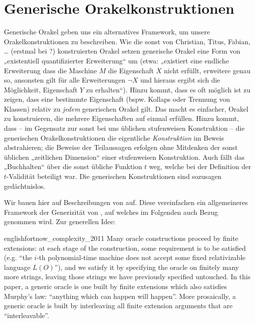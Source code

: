 \documentclass[nofonts]{uebung}
\theoremstyle{definition}
\begin{document}
\clearpage
\section{Generische Orakelkonstruktionen}

Generische Orakel geben uns ein alternatives Framework, um unsere Orakelkonstruktionen zu beschreiben. Wie die sonst von Christian, Titus, Fabian, \dots{} (erstmal bei \cite{dose_np-completeness_2019}?) konstruierten Orakel setzen generische Orakel eine Form von „existentiell quantifizierter Erweiterung“ um (etwa: „existiert eine endliche Erweiterung dass die Maschine $M$ die Eigenschaft $X$ nicht erfüllt, erweitere genau so, ansonsten gilt für alle Erweiterungen $\neg X$ und hieraus ergibt sich die Möglichkeit, Eigenschaft $Y$ zu erhalten“).
Hinzu kommt, dass es oft möglich ist zu zeigen, dass eine bestimmte Eigenschaft (bspw. Kollaps oder Trennung von Klassen) relativ zu \emph{jedem} generischen Orakel gilt. Das macht es einfacher, Orakel zu konstruieren, die mehrere Eigenschaften auf einmal erfüllen.
Hinzu kommt, dass -- im Gegensatz zur sonst bei uns üblichen stufenweisen Konstruktion  -- die generischen Orakelkonstruktionen die eigentliche \emph{Konstruktion} im Beweis abstrahieren; die Beweise der Teilaussagen erfolgen ohne Mitdenken der sonst üblichen „zeitlichen Dimension“ einer stufenweisen Konstruktion. Auch fällt das „Buchhalten“ über die sonst übliche Funktion $t$ weg, welche bei der Definition der $t$-Validität beteiligt war. Die generischen Konstruktionen sind sozusagen gedächtnislos.

Wir bauen hier auf Beschreibungen von \textcite{fortnow_complexity_2011} auf. Diese vereinfachen ein allgemeineres Framework der Generizität von \textcite{fenner_oracle_2003}, auf welches im Folgenden auch Bezug genommen wird.
Zur generellen Idee:

\begin{foreigndisplaycquote}{english}{fortnow_complexity_2011}
Many oracle constructions proceed by finite extensions: at each stage of the construction, some requirement is to be satisfied (e.g. “the $i$-th polynomial-time machine does not accept some fixed relativizable language $L(O)$”), and we satisfy it by specifying the oracle on finitely many more strings, leaving those strings we have previously specified untouched. In this paper, a generic oracle is one built by finite extensions which also satisfies Murphy’s law: “anything which can happen will happen”. More prosaically, a generic oracle is built by interleaving all finite extension arguments that are “interleavable”.
\end{foreigndisplaycquote}
\end{document}
